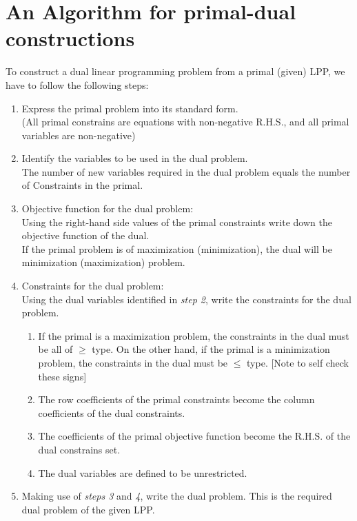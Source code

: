 \documentclass[../main-sheet.tex]{subfiles}
\begin{document}
\section{An Algorithm for primal-dual constructions}
To construct a dual linear programming problem from a primal (given) LPP, we have to follow the following steps:
\begin{enumerate}[label={Step \arabic*:}]
    \item Express the primal problem into its standard form.\\
    (All primal constrains are equations with non-negative R.H.S., and all primal variables are non-negative)
    \item Identify the variables to be used in the dual problem.\\
    The number of new variables required in the dual problem equals the number of Constraints in the primal.
    \item Objective function for the dual problem:\\
    Using the right-hand side values of the primal constraints write down the objective function of the dual.\\
    If the primal problem is of maximization (minimization), the dual will be minimization (maximization) problem.
    \item Constraints for the dual problem:\\
    Using the dual variables identified in \emph{step 2}, write the constraints for the dual problem.
    \begin{enumerate}[label=(\roman*)]
        \item If the primal is a maximization problem, the constraints in the dual must be all of \(\geq\) type. On the other hand, if the primal is a minimization problem, the constraints in the dual must be \(\leq\) type. [Note to self check these signs]
        \item The row coefficients of the primal constraints become the column coefficients of the dual constraints.
        \item The coefficients of the primal objective function become the R.H.S. of the dual constrains set.
        \item The dual variables are defined to be unrestricted.
    \end{enumerate}
    \item Making use of \emph{steps 3} and \emph{4}, write the dual problem. This is the required dual problem of the given LPP.
\end{enumerate}
\end{document}
